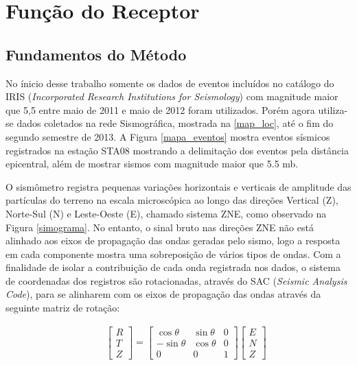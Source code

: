 \chapter{Função do Receptor}

\section{Fundamentos do Método}

No ínicio desse trabalho somente os dados de eventos incluídos no catálogo do IRIS (\textit{Incorporated Research Institutions for Seismology}) com magnitude maior que 5,5 entre maio de 2011 e maio de 2012 foram utilizados. Porém agora utiliza-se dados coletados na rede Sismográfica, mostrada na \ref{map_loc}, até o fim do segundo semestre de 2013. A Figura \ref{mapa_eventos} mostra eventos sísmicos registrados na estação STA08 mostrando a delimitação dos eventos pela distância epicentral, além de mostrar sismos com magnitude maior que 5.5 mb.

O sismômetro registra pequenas variações horizontais e verticais de amplitude das partículas do terreno na escala microscópica ao longo das direções Vertical (Z), Norte-Sul (N) e Leste-Oeste (E), chamado sistema ZNE, como observado na Figura \ref{simograma}. No entanto, o sinal bruto nas direções ZNE não está alinhado aos eixos de propagação das ondas geradas pelo sismo, logo a resposta em cada componente mostra uma sobreposição de vários tipos de ondas. Com a finalidade de isolar a contribuição de cada onda registrada nos dados, o sistema de coordenadas dos registros são rotacionadas, através do SAC (\textit{Seismic Analysis Code}), para se alinharem com os eixos de propagação das ondas através da seguinte matriz de rotação:

\begin{eqnarray}
 & & \left[ \begin{array}{c} R \\ T \\ Z \end{array} \right] = \begin{bmatrix} \cos \theta & \sin \theta & 0 \\ - \sin \theta & \cos \theta & 0 \\ 0 & 0 & 1 \end{bmatrix} \left[ \begin{array}{c} E \\ N \\ Z \end{array} \right]
\label{rotacao}
\end{eqnarray}

